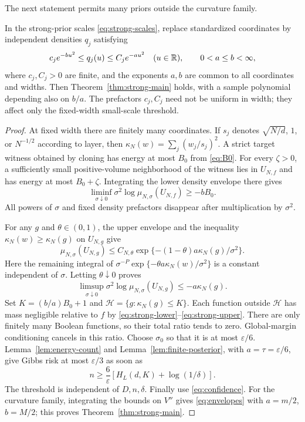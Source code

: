 The next statement permits many priors outside the curvature family.
\begin{proposition}\label{prop:envelopes}
In the strong-prior scales \eqref{eq:strong-scales}, replace standardized
coordinates by independent densities $q_j$ satisfying
\begin{equation}\label{eq:envelopes}
 c_j e^{-b u^2}\leq q_j(u)\leq C_j e^{-a u^2}
 \quad(u\in\mathbb R),\qquad 0<a\leq b<\infty,
\end{equation}
where $c_j,C_j>0$ are finite, and the exponents $a,b$ are common to all
coordinates and widths. Then Theorem~\ref{thm:strong-main} holds, with a
sample polynomial depending also on $b/a$. The prefactors $c_j,C_j$ need
not be uniform in width; they affect only the fixed-width small-scale
threshold.
\end{proposition}
\begin{proof}
At fixed width there are finitely many coordinates. If $s_j$ denotes
$\sqrt{N/d}$, $1$, or $N^{-1/2}$ according to layer, then
$\kappa_N(w)=\sum_j(w_j/s_j)^2$. A strict target witness obtained by
cloning has energy at most $B_0$ from \eqref{eq:B0}. For every
$\zeta>0$, a sufficiently small positive-volume neighborhood of the
witness lies in $U_{N,f}$ and has energy at most $B_0+\zeta$.
Integrating the lower density envelope there gives
\begin{equation}\label{eq:strong-lower}
 \liminf_{\sigma\downarrow0}\sigma^2
       \log\mu_{N,\sigma}(U_{N,f})\geq-bB_0.
\end{equation}
All powers of $\sigma$ and fixed density prefactors disappear after
multiplication by $\sigma^2$.

For any $g$ and $\theta\in(0,1)$, the upper envelope and the inequality
$\kappa_N(w)\geq\kappa_N(g)$ on $U_{N,g}$ give
\[
 \mu_{N,\sigma}(U_{N,g})
 \leq C_{N,\theta}
  \exp\{-(1-\theta)a\kappa_N(g)/\sigma^2\}.
\]
Here the remaining integral of
$\sigma^{-P}\exp\{-\theta a\kappa_N(w)/\sigma^2\}$ is a constant
independent of $\sigma$. Letting $\theta\downarrow0$ proves
\begin{equation}\label{eq:strong-upper}
 \limsup_{\sigma\downarrow0}\sigma^2
       \log\mu_{N,\sigma}(U_{N,g})\leq-a\kappa_N(g).
\end{equation}
Set $K=(b/a)B_0+1$ and $\mathcal H=\{g:\kappa_N(g)\leq K\}$.
Each function outside $\mathcal H$ has mass negligible relative to $f$
by \eqref{eq:strong-lower}--\eqref{eq:strong-upper}. There are only
finitely many Boolean functions, so their total ratio tends to zero.
Global-margin conditioning cancels in this ratio. Choose $\sigma_0$ so
that it is at most $\varepsilon/6$. Lemma~\ref{lem:energy-count} and
Lemma~\ref{lem:finite-posterior}, with $a=\tau=\varepsilon/6$, give
Gibbs risk at most $\varepsilon/3$ as soon as
\[
 n\geq\frac6\varepsilon[H_L(d,K)+\log(1/\delta)].
\]
The threshold is independent of $D,n,\delta$. Finally use
\eqref{eq:confidence}. For the curvature family, integrating the bounds
on $V''$ gives \eqref{eq:envelopes} with $a=m/2$, $b=M/2$;
this proves Theorem~\ref{thm:strong-main}.
\end{proof}

